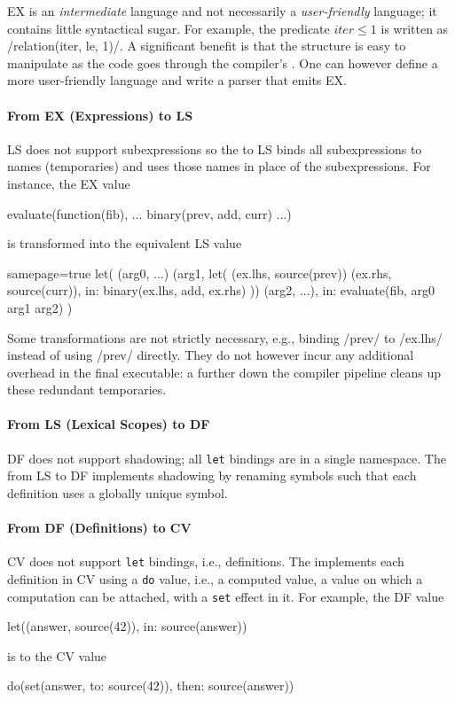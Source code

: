 \documentclass[main.tex]{subfiles}
\begin{document}
EX is an \emph{intermediate} language and not necessarily a \emph{user-friendly} language; it contains little syntactical sugar. For example, the predicate $ \textit{iter} \le 1 $ is written as \iil/relation(iter, le, 1)/. A significant benefit is that the structure is easy to manipulate as the code goes through the compiler's . One can however define a more user-friendly language and write a parser that emits EX.

\paragraph{From EX (Expressions) to LS} LS does not support subexpressions so the  to LS binds all subexpressions to names (temporaries) and uses those names in place of the subexpressions. For instance, the EX value
\begin{il}
	evaluate(function(fib), ... binary(prev, add, curr) ...)
\end{il}
is transformed into the equivalent LS value
\begin{il*}{samepage=true}
	let(
		(arg0, ...) (arg1, let(
			(ex.lhs, source(prev)) (ex.rhs, source(curr)),
			in: binary(ex.lhs, add, ex.rhs)
		)) (arg2, ...),
		in: evaluate(fib, arg0 arg1 arg2)
	)
\end{il*}

Some transformations are not strictly necessary, e.g., binding \iil/prev/ to \iil/ex.lhs/ instead of using \iil/prev/ directly. They do not however incur any additional overhead in the final executable: a  further down the compiler pipeline cleans up these redundant temporaries.

\paragraph{From LS (Lexical Scopes) to DF} DF does not support shadowing; all \texttt{let} bindings are in a single namespace. The  from LS to DF implements shadowing by renaming symbols such that each definition uses a globally unique symbol.

\paragraph{From DF (Definitions) to CV} CV does not support \texttt{let} bindings, i.e., definitions. The  implements each definition in CV using a \texttt{do} value, i.e., a computed value, a value on which a computation can be attached, with a \texttt{set} effect in it. For example, the DF value
\begin{il}
	let((answer, source(42)), in: source(answer))
\end{il}
is \lowered{} to the CV value
\begin{il}
	do(set(answer, to: source(42)), then: source(answer))
\end{il}
\end{document}
